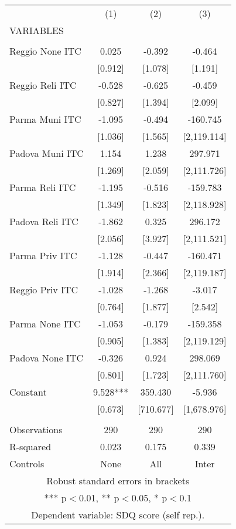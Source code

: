 \begin{tabular}{lccc} \hline
 & (1) & (2) & (3) \\
VARIABLES &  &  &  \\ \hline
 &  &  &  \\
Reggio None ITC & 0.025 & -0.392 & -0.464 \\
 & [0.912] & [1.078] & [1.191] \\
Reggio Reli ITC & -0.528 & -0.625 & -0.459 \\
 & [0.827] & [1.394] & [2.099] \\
Parma Muni ITC & -1.095 & -0.494 & -160.745 \\
 & [1.036] & [1.565] & [2,119.114] \\
Padova Muni ITC & 1.154 & 1.238 & 297.971 \\
 & [1.269] & [2.059] & [2,111.726] \\
Parma Reli ITC & -1.195 & -0.516 & -159.783 \\
 & [1.349] & [1.823] & [2,118.928] \\
Padova Reli ITC & -1.862 & 0.325 & 296.172 \\
 & [2.056] & [3.927] & [2,111.521] \\
Parma Priv ITC & -1.128 & -0.447 & -160.471 \\
 & [1.914] & [2.366] & [2,119.187] \\
Reggio Priv ITC & -1.028 & -1.268 & -3.017 \\
 & [0.764] & [1.877] & [2.542] \\
Parma None ITC & -1.053 & -0.179 & -159.358 \\
 & [0.905] & [1.383] & [2,119.129] \\
Padova None ITC & -0.326 & 0.924 & 298.069 \\
 & [0.801] & [1.723] & [2,111.760] \\
Constant & 9.528*** & 359.430 & -5.936 \\
 & [0.673] & [710.677] & [1,678.976] \\
 &  &  &  \\
Observations & 290 & 290 & 290 \\
R-squared & 0.023 & 0.175 & 0.339 \\
 Controls & None & All & Inter \\ \hline
\multicolumn{4}{c}{ Robust standard errors in brackets} \\
\multicolumn{4}{c}{ *** p$<$0.01, ** p$<$0.05, * p$<$0.1} \\
\multicolumn{4}{c}{ Dependent variable: SDQ score (self rep.).} \\
\end{tabular}
